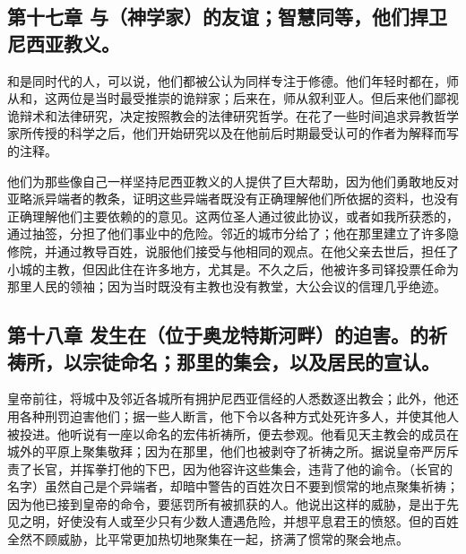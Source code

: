 
\subsection{第十七章 与（神学家）的友谊；智慧同等，他们捍卫尼西亚教义。}

和是同时代的人，可以说，他们都被公认为同样专注于修德。他们年轻时都在，师从和，这两位是当时最受推崇的诡辩家；后来在，师从叙利亚人。但后来他们鄙视诡辩术和法律研究，决定按照教会的法律研究哲学。在花了一些时间追求异教哲学家所传授的科学之后，他们开始研究以及在他前后时期最受认可的作者为解释而写的注释。\par

他们为那些像自己一样坚持尼西亚教义的人提供了巨大帮助，因为他们勇敢地反对亚略派异端者的教条，证明这些异端者既没有正确理解他们所依据的资料，也没有正确理解他们主要依赖的的意见。这两位圣人通过彼此协议，或者如我所获悉的，通过抽签，分担了他们事业中的危险。邻近的城市分给了；他在那里建立了许多隐修院，并通过教导百姓，说服他们接受与他相同的观点。在他父亲去世后，担任了小城的主教，但因此住在许多地方，尤其是。不久之后，他被许多司铎投票任命为那里人民的领袖；因为当时既没有主教也没有教堂，大公会议的信理几乎绝迹。\par


\subsection{第十八章 发生在（位于奥龙特斯河畔）的迫害。的祈祷所，以宗徒命名；那里的集会，以及居民的宣认。}

皇帝前往，将城中及邻近各城所有拥护尼西亚信经的人悉数逐出教会；此外，他还用各种刑罚迫害他们；据一些人断言，他下令以各种方式处死许多人，并使其他人被投进。他听说有一座以命名的宏伟祈祷所，便去参观。他看见天主教会的成员在城外的平原上聚集敬拜；因为在那里，他们也被剥夺了祈祷之所。据说皇帝严厉斥责了长官，并挥拳打他的下巴，因为他容许这些集会，违背了他的谕令。（长官的名字）虽然自己是个异端者，却暗中警告的百姓次日不要到惯常的地点聚集祈祷；因为他已接到皇帝的命令，要惩罚所有被抓获的人。他说出这样的威胁，是出于先见之明，好使没有人或至少只有少数人遭遇危险，并想平息君王的愤怒。但的百姓全然不顾威胁，比平常更加热切地聚集在一起，挤满了惯常的聚会地点。\par

